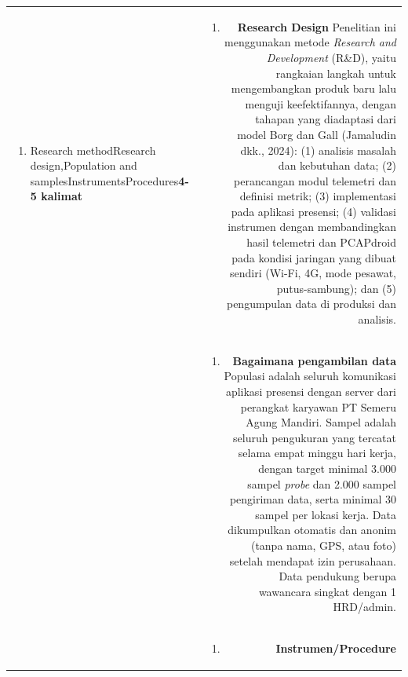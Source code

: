 \documentclass[11pt,a4paper]{article}
\begin{document}
\begin{longtable}{|L|R|}
\begin{enumerate}[label=\arabic*.,start=4]
\item Research method\newline Research design,\newline Population and samples\newline Instruments\newline Procedures\newline \textbf{4-5 kalimat}
\end{enumerate}
&
\begin{enumerate}[label=\arabic*.]
\item \textbf{Research Design}\newline
Penelitian ini menggunakan metode \textit{Research and Development} (R\&D), yaitu rangkaian langkah untuk mengembangkan produk baru lalu menguji keefektifannya, dengan tahapan yang diadaptasi dari model Borg dan Gall (Jamaludin dkk., 2024):\newline
(1) analisis masalah dan kebutuhan data;\newline
(2) perancangan modul telemetri dan definisi metrik;\newline
(3) implementasi pada aplikasi presensi;\newline
(4) validasi instrumen dengan membandingkan hasil telemetri dan PCAPdroid pada kondisi jaringan yang dibuat sendiri (Wi-Fi, 4G, mode pesawat, putus-sambung); dan\newline
(5) pengumpulan data di produksi dan analisis.
\end{enumerate}
\\
&
\begin{enumerate}[label=\arabic*.,start=2]
\item \textbf{Bagaimana pengambilan data}\newline
Populasi adalah seluruh komunikasi aplikasi presensi dengan server dari perangkat karyawan PT Semeru Agung Mandiri. Sampel adalah seluruh pengukuran yang tercatat selama empat minggu hari kerja, dengan target minimal 3.000 sampel \textit{probe} dan 2.000 sampel pengiriman data, serta minimal 30 sampel per lokasi kerja. Data dikumpulkan otomatis dan anonim (tanpa nama, GPS, atau foto) setelah mendapat izin perusahaan. Data pendukung berupa wawancara singkat dengan 1 HRD/admin.
\end{enumerate}
\\
&
\begin{enumerate}[label=\arabic*.,start=3]
\item \textbf{Instrumen/Procedure}\newline

\end{enumerate}
\end{longtable}
\end{document}
